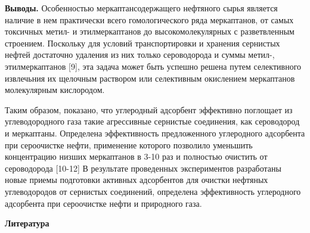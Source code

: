 {\bfseries Выводы.} Особенностью меркаптансодержащего нефтяного сырья
является наличие в нем практически всего гомологического ряда
меркаптанов, от самых токсичных метил- и этилмеркаптанов до
высокомолекулярных с разветвленным строением. Поскольку для условий
транспортировки и хранения сернистых нефтей достаточно удаления из них
только сероводорода и суммы метил-, этилмеркаптанов {[}9{]}, эта задача
может быть успешно решена путем селективного извлечьния их щелочным
раствором или селективным окислением меркаптанов молекулярным
кислородом.

Таким образом, показано, что углеродный адсорбент эффективно поглощает
из углеводородного газа такие агрессивные сернистые соединения, как
сероводород и меркаптаны. Определена эффективность предложенного
углеродного адсорбента при сероочистке нефти, применение которого
позволило уменьшить концентрацию низших меркаптанов в 3-10 раз и
полностью очистить от сероводорода {[}10-12{]} В результате проведенных
экспериментов разработаны новые приемы подготовки активных адсорбентов
для очистки нефтяных углеводородов от сернистых соединений, определена
эффективность углеродного адсорбента при сероочистке нефти и природного
газа.

{\bfseries Литература}

